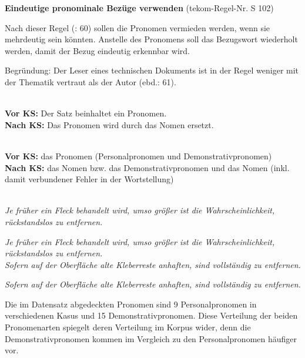\begin{description}[font=\normalfont\bfseries]
\item [Beschreibung der KS-Regel:] \textbf{Eindeutige pronominale Bezüge verwenden} (tekom-Regel-Nr. S 102)

Nach dieser Regel (\citealt{tekom2013}: 60) sollen die Pronomen vermieden werden, wenn sie mehrdeutig sein könnten. Anstelle des Pronomens soll das Bezugswort wiederholt werden, damit der Bezug eindeutig erkennbar wird.

Begründung: Der Leser eines technischen Dokuments ist in der Regel weniger mit der Thematik vertraut als der Autor (ebd.: 61).

\item[Umsetzungsmuster:]
~\\
\textbf{Vor KS:} Der Satz beinhaltet ein Pronomen.\\
\textbf{Nach KS:} Das Pronomen wird durch das Nomen ersetzt.

\item[KS-Stelle]
~\\
\textbf{Vor KS:} das Pronomen (Personalpronomen und Demonstrativpronomen)\\
\textbf{Nach KS:} das Nomen bzw. das Demonstrativpronomen und das Nomen (inkl. damit verbundener Fehler in der Wortstellung)

\item[Beispiele]
~\\
\textit{Je früher ein Fleck behandelt wird, umso größer ist die Wahrscheinlichkeit,  rückstandslos zu entfernen.}

\textit{Je früher ein Fleck behandelt wird, umso größer ist die Wahrscheinlichkeit,  rückstandslos zu entfernen.}
~\\
\textit{Sofern auf der Oberfläche alte Kleberreste anhaften, sind  vollständig zu entfernen.}

\textit{Sofern auf der Oberfläche alte Kleberreste anhaften, sind  vollständig zu entfernen.}

\item[Aufteilung der Testsätze:]
Die im Datensatz abgedeckten Pronomen sind 9 Personalpronomen in verschiedenen Kasus und 15 Demonstrativpronomen. Diese Verteilung der beiden Pronomenarten spiegelt deren Verteilung im Korpus wider, denn die Demonstrativpronomen kommen im Vergleich zu den Personalpronomen häufiger vor.

\end{description}

